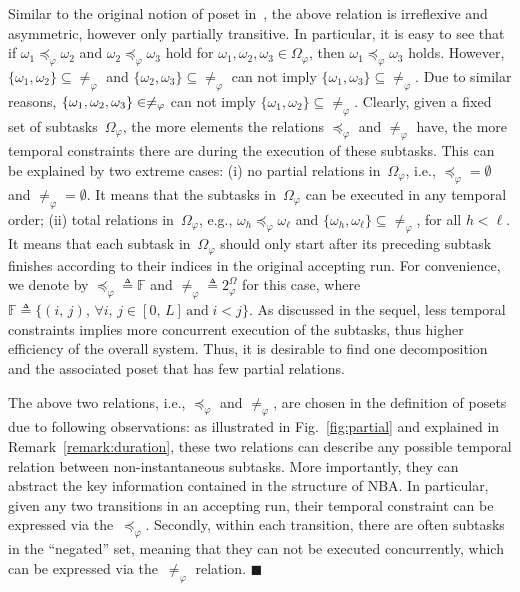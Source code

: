Similar to the original notion of poset in~\cite{simovici2008mathematical},
the above relation is irreflexive and asymmetric,
however only partially transitive.
In particular, it is easy to see that
if $\omega_1\preceq_{\varphi} \omega_2$ and $\omega_2\preceq_{\varphi} \omega_3$
hold for $\omega_1,\omega_2,\omega_3\in \Omega_{\varphi}$,
then $\omega_1\preceq_{\varphi}\omega_3$ holds.
However, $\{\omega_1,\omega_2\}\subseteq\neq_{\varphi} $ and $\{\omega_2,\omega_3\}\subseteq\neq_{\varphi}$
can not imply $\{\omega_1,\omega_3\}\subseteq\neq_{\varphi}$.
Due to similar reasons, $\{\omega_1,\omega_2,\\\omega_3\}\in\neq_\varphi$ can not imply $\{\omega_1,\omega_2\}\subseteq\neq_{\varphi}$.
Clearly, given a fixed set of subtasks~$\Omega_{\varphi}$, the more elements
the relations $\preceq_{\varphi}$ and $\neq_{\varphi}$ have,
the more temporal constraints there are during the execution of these subtasks.
This can be explained by two extreme cases:
(i) no partial relations in~$\Omega_{\varphi}$, i.e.,
$\preceq_{\varphi}=\emptyset$ and $\neq_{\varphi}=\emptyset$.
It means that the subtasks in~$\Omega_{\varphi}$ can be executed in any temporal order;
(ii) total relations in~$\Omega_{\varphi}$,
e.g., $\omega_h \preceq_{\varphi} \omega_\ell$
and $\{\omega_h, \omega_\ell \}\subseteq\neq_{\varphi} $, for all $h<\ell$.
It means that each subtask in~$\Omega_{\varphi}$ should only start after
its preceding subtask finishes according to their indices in the original accepting run.
For convenience, we denote by $\preceq_{\varphi} \triangleq \mathbb{F}$
and $\neq_{\varphi} \triangleq 2^\Omega_{\varphi}$ for this case,
where $\mathbb{F}\triangleq \{(i,\, j),\, \forall i,\,j\in [0,\, L] \,\text{and}\; i<j\}$.
As discussed in the sequel,
less temporal constraints implies more concurrent execution of the subtasks,
thus higher efficiency of the overall system.
Thus, it is desirable to find one decomposition and the associated poset
that has few partial relations.


\begin{remark}\label{remark:partial-order-motivation}
The above two relations, i.e., $\preceq_\varphi$ and $\neq_\varphi$,
are chosen in the definition of posets due to following observations:
as illustrated in Fig.~\ref{fig:partial} and explained in Remark~\ref{remark:duration},
these two relations can describe any possible temporal relation
between non-instantaneous subtasks.
More importantly,
they can abstract the key information contained in the structure of NBA.
In particular, given any two transitions in an accepting run,
their temporal constraint can be expressed via the~$\preceq_\varphi$.
Secondly, within each transition, there are often subtasks in the ``negated'' set,
meaning that they can not be executed concurrently,
which can be expressed via the~$\neq_\varphi$ relation.
\hfill $\blacksquare$
\end{remark}

